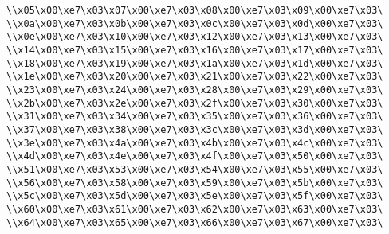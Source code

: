\verb|\\x05\x00\xe7\x03\x07\x00\xe7\x03\x08\x00\xe7\x03\x09\x00\xe7\x03\|\newline
\verb|\\x0a\x00\xe7\x03\x0b\x00\xe7\x03\x0c\x00\xe7\x03\x0d\x00\xe7\x03\|\newline
\verb|\\x0e\x00\xe7\x03\x10\x00\xe7\x03\x12\x00\xe7\x03\x13\x00\xe7\x03\|\newline
\verb|\\x14\x00\xe7\x03\x15\x00\xe7\x03\x16\x00\xe7\x03\x17\x00\xe7\x03\|\newline
\verb|\\x18\x00\xe7\x03\x19\x00\xe7\x03\x1a\x00\xe7\x03\x1d\x00\xe7\x03\|\newline
\verb|\\x1e\x00\xe7\x03\x20\x00\xe7\x03\x21\x00\xe7\x03\x22\x00\xe7\x03\|\newline
\verb|\\x23\x00\xe7\x03\x24\x00\xe7\x03\x28\x00\xe7\x03\x29\x00\xe7\x03\|\newline
\verb|\\x2b\x00\xe7\x03\x2e\x00\xe7\x03\x2f\x00\xe7\x03\x30\x00\xe7\x03\|\newline
\verb|\\x31\x00\xe7\x03\x34\x00\xe7\x03\x35\x00\xe7\x03\x36\x00\xe7\x03\|\newline
\verb|\\x37\x00\xe7\x03\x38\x00\xe7\x03\x3c\x00\xe7\x03\x3d\x00\xe7\x03\|\newline
\verb|\\x3e\x00\xe7\x03\x4a\x00\xe7\x03\x4b\x00\xe7\x03\x4c\x00\xe7\x03\|\newline
\verb|\\x4d\x00\xe7\x03\x4e\x00\xe7\x03\x4f\x00\xe7\x03\x50\x00\xe7\x03\|\newline
\verb|\\x51\x00\xe7\x03\x53\x00\xe7\x03\x54\x00\xe7\x03\x55\x00\xe7\x03\|\newline
\verb|\\x56\x00\xe7\x03\x58\x00\xe7\x03\x59\x00\xe7\x03\x5b\x00\xe7\x03\|\newline
\verb|\\x5c\x00\xe7\x03\x5d\x00\xe7\x03\x5e\x00\xe7\x03\x5f\x00\xe7\x03\|\newline
\verb|\\x60\x00\xe7\x03\x61\x00\xe7\x03\x62\x00\xe7\x03\x63\x00\xe7\x03\|\newline
\verb|\\x64\x00\xe7\x03\x65\x00\xe7\x03\x66\x00\xe7\x03\x67\x00\xe7\x03\|\newline
